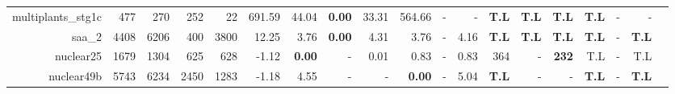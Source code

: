 \begin{table*}[t]
\begin{tabular}{|r|r|r|r|r||r||r|r|r|r|r|r||r|r|r|r|r|r|r|}
              multiplants\_stg1c &          477 &          270 &          252 &           22 &              691.59 &          44.04 &\textbf{0.00} &          33.31 &         564.66 &              - &              - & \textbf{T.L} &       \textbf{T.L} &       \textbf{T.L} &       \textbf{T.L} &           - &           - \\ 
                          saa\_2 &         4408 &         6206 &          400 &         3800 &               12.25 &           3.76 &\textbf{0.00} &           4.31 &           3.76 &              - &           4.16 & \textbf{T.L} &       \textbf{T.L} &       \textbf{T.L} &       \textbf{T.L} &           - &\textbf{T.L} \\ 
                       nuclear25 &         1679 &         1304 &          625 &          628 &               -1.12 &  \textbf{0.00} &            - &           0.01 &           0.83 &              - &           0.83 &          364 &                  - &       \textbf{232} &                T.L &           - &         T.L \\ 
                      nuclear49b &         5743 &         6234 &         2450 &         1283 &               -1.18 &           4.55 &            - &              - &  \textbf{0.00} &              - &           5.04 & \textbf{T.L} &                  - &                  - &       \textbf{T.L} &           - &\textbf{T.L} \\ 
\hline 
\end{tabular}\\ 
\label{table:results} 
\end{table*} 
